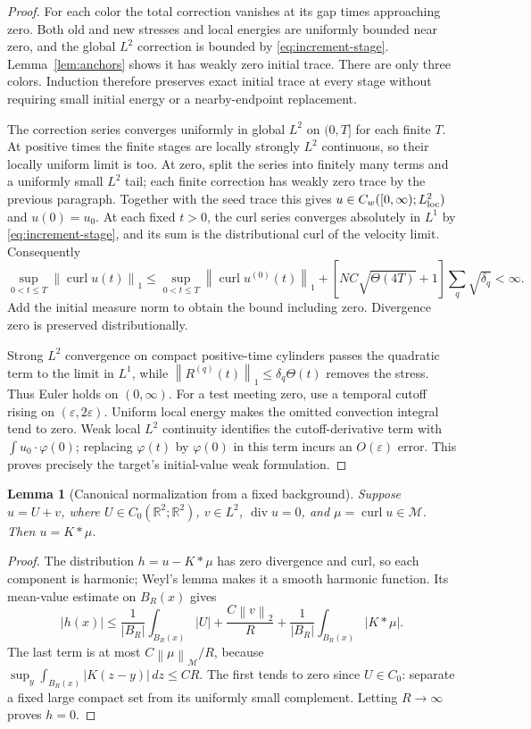 \documentclass[11pt]{article}
\newtheorem{lemma}[theorem]{Lemma}
\theoremstyle{remark}\newtheorem{remark}[theorem]{Remark}
\newcommand{\R}{\mathbb R}
\newcommand{\M}{\mathcal M}
\newcommand{\curl}{\operatorname{curl}}
\newcommand{\Div}{\operatorname{div}}
\newcommand{\norm}[2]{\left\|#1\right\|_{#2}}
\begin{document}
\begin{proof}
For each color the total correction vanishes at its gap times approaching
zero. Both old and new stresses and local energies are uniformly bounded
near zero, and the global $L^2$ correction is bounded by
\eqref{eq:increment-stage}. Lemma~\ref{lem:anchors} shows it has weakly zero
initial trace. There are only three colors. Induction therefore preserves
exact initial trace at every stage without requiring small initial energy
or a nearby-endpoint replacement.

The correction series converges uniformly in global $L^2$ on $(0,T]$
for each finite $T$. At positive times the finite stages are locally
strongly $L^2$ continuous, so their locally uniform limit is too. At zero,
split the series into finitely many terms and a uniformly small $L^2$ tail;
each finite correction has weakly zero trace by the previous paragraph.
Together with the seed trace this gives
$u\in C_w([0,\infty);L^2_{\rm loc})$ and $u(0)=u_0$.
At each fixed $t>0$, the curl series converges absolutely in $L^1$ by
\eqref{eq:increment-stage}, and its sum is the distributional curl of the
velocity limit. Consequently
\[
 \sup_{0<t\leq T}\norm{\curl u(t)}1\leq
 \sup_{0<t\leq T}\norm{\curl u^{(0)}(t)}1+
 [NC\sqrt{\Theta(4T)}+1]\sum_q\sqrt{\delta_q}<\infty.
\]
Add the initial measure norm to obtain the bound including zero.
Divergence zero is preserved distributionally.

Strong $L^2$ convergence on compact positive-time cylinders passes the
quadratic term to the limit in $L^1$, while
$\norm{R^{(q)}(t)}1\leq\delta_q\Theta(t)$ removes the stress. Thus Euler
holds on $(0,\infty)$. For a test meeting zero, use a temporal cutoff rising
on $(\varepsilon,2\varepsilon)$. Uniform local energy makes the omitted
convection integral tend to zero. Weak local $L^2$ continuity identifies
the cutoff-derivative term with $\int u_0\cdot\varphi(0)$; replacing
$\varphi(t)$ by $\varphi(0)$ in this term incurs an $O(\varepsilon)$ error.
This proves precisely the target's initial-value weak formulation.
\end{proof}

\begin{lemma}[Canonical normalization from a fixed background]\label{lem:canonical}
Suppose $u=U+v$, where $U\in C_0(\R^2;\R^2)$, $v\in L^2$, $\Div u=0$,
and $\mu=\curl u\in\M$. Then $u=K*\mu$.
\end{lemma}
\begin{proof}
The distribution $h=u-K*\mu$ has zero divergence and curl, so each component
is harmonic; Weyl's lemma makes it a smooth harmonic function. Its mean-value
estimate on $B_R(x)$ gives
\[
 |h(x)|\leq\frac1{|B_R|}\int_{B_R(x)}|U|
 +\frac{C\norm v2}{R}
 +\frac1{|B_R|}\int_{B_R(x)}|K*\mu|.
\]
The last term is at most $C\norm\mu\M/R$, because
$\sup_y\int_{B_R(x)}|K(z-y)|\,dz\leq CR$. The first tends to zero since
$U\in C_0$: separate a fixed large compact set from its uniformly small
complement. Letting $R\to\infty$ proves $h=0$.
\end{proof}
\end{document}
